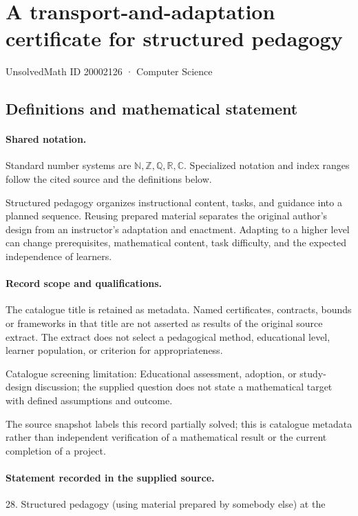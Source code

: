 \documentclass[11pt]{article}
\begin{document}
\setcounter{section}{20002125}
\section{A transport-and-adaptation certificate for structured pedagogy}\label{20002126}
{\small\sffamily UnsolvedMath ID 20002126 · Computer Science}
\subsection{Definitions and mathematical statement}

\paragraph{Shared notation.}Standard number systems are $\mathbb N,\mathbb Z,\mathbb Q,\mathbb R,\mathbb C$. Specialized notation and index ranges follow the cited source and the definitions below.


Structured pedagogy organizes instructional content, tasks, and guidance into a planned sequence. Reusing prepared material separates the original author's design from an instructor's adaptation and enactment. Adapting to a higher level can change prerequisites, mathematical content, task difficulty, and the expected independence of learners.
\paragraph{Record scope and qualifications.}
The catalogue title is retained as metadata. Named certificates, contracts, bounds or frameworks in that title are not asserted as results of the original source extract.
The extract does not select a pedagogical method, educational level, learner population, or criterion for appropriateness.

Catalogue screening limitation: Educational assessment, adoption, or study-design discussion; the supplied question does not state a mathematical target with defined assumptions and outcome.

The source snapshot labels this record partially solved; this is catalogue metadata rather than independent verification of a mathematical result or the current completion of a project.
\paragraph{Statement recorded in the supplied source.}
28. Structured pedagogy (using material prepared by somebody else) at the
\end{document}
